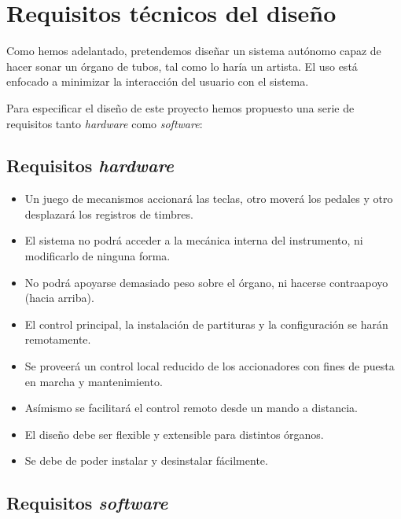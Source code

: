 \chapter{Requisitos técnicos del diseño}
\label{cap:capitulo_2}

Como hemos adelantado, pretendemos diseñar un sistema autónomo capaz de hacer sonar un órgano de tubos, tal como lo haría un artista. El uso está enfocado a minimizar la interacción del usuario con el sistema. 

Para especificar el diseño de este proyecto hemos propuesto una serie de requisitos tanto \textit{hardware} como \textit{software}:

\section{Requisitos \textit{hardware}}

\begin{itemize}
	
	\item Un juego de mecanismos accionará las teclas, otro moverá los pedales y otro desplazará los registros de timbres.
	
	\item El sistema no podrá acceder a la mecánica interna del instrumento, ni modificarlo de ninguna forma.
	
	\item No podrá apoyarse demasiado peso sobre el órgano, ni hacerse contraapoyo (hacia arriba).
	
	\item El control principal, la instalación de partituras y la configuración se harán remotamente.
	
	\item Se proveerá un control local reducido de los accionadores con fines de puesta en marcha y mantenimiento.
	
	\item Asímismo se facilitará el control remoto desde un mando a distancia.
	
	\item El diseño debe ser flexible y extensible para distintos órganos.
	
	\item Se debe de poder instalar y desinstalar fácilmente.
	
\end{itemize}

\section{Requisitos \textit{software}}

